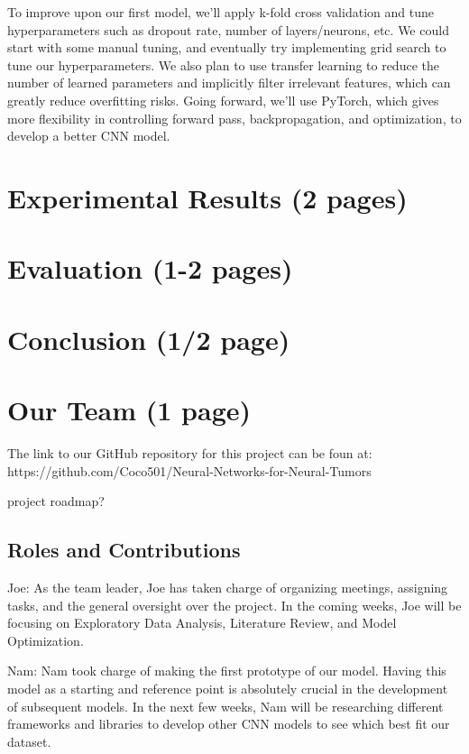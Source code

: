 \documentclass[conference]{IEEEtran}
\begin{document}
To improve upon our first model, we'll apply k-fold cross validation and tune hyperparameters such as dropout rate, number of layers/neurons, etc. We could start with some manual tuning, and eventually try implementing grid search to tune our hyperparameters. We also plan to use transfer learning to reduce the number of learned parameters and implicitly filter irrelevant features, which can greatly reduce overfitting risks. Going forward, we'll use PyTorch, which gives more flexibility in controlling forward pass, backpropagation, and optimization, to develop a better CNN model.


\section{Experimental Results (2 pages)}

\section{Evaluation (1-2 pages)}

\section{Conclusion (1/2 page)}

\section{Our Team (1 page)}
The link to our GitHub repository for this project can be foun at: https://github.com/Coco501/Neural-Networks-for-Neural-Tumors

project roadmap? 

\subsection{Roles and Contributions}

Joe: As the team leader, Joe has taken charge of organizing meetings, assigning tasks, and the general oversight over the project. In the coming weeks, Joe will be focusing on Exploratory Data Analysis, Literature Review, and Model Optimization. 

Nam: Nam took charge of making the first prototype of our model. Having this model as a starting and reference point is absolutely crucial in the development of subsequent models. In the next few weeks, Nam will be researching different frameworks and libraries to develop other CNN models to see which best fit our dataset.
\end{document}
